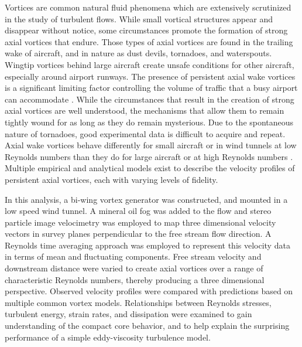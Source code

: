 Vortices are common natural fluid phenomena which are extensively scrutinized 
in the study of turbulent flows. While small vortical structures appear and 
disappear without notice, some circumstances promote the formation of strong 
axial vortices that endure. Those types of axial vortices are found in the 
trailing wake of aircraft, and in nature as dust devils, tornadoes, and 
waterspouts. Wingtip vortices behind large aircraft create unsafe conditions 
for other aircraft, especially around airport runways. The presence of 
persistent axial wake vortices is a significant limiting factor controlling the 
volume of traffic that a busy airport can accommodate \cite{hallock1991}. While 
the circumstances that result 
in the creation of strong axial vortices are well understood, the mechanisms 
that allow them to remain tightly wound for as long as they do remain 
mysterious. 
Due to the spontaneous nature of tornadoes, good experimental data is difficult 
to acquire and repeat. Axial wake vortices behave differently for 
small aircraft or in wind tunnels at low Reynolds numbers than they do for 
large aircraft or at high Reynolds numbers \cite{burnam2013}. Multiple 
empirical and analytical models exist to describe the velocity profiles of 
persistent axial vortices, each with varying levels of fidelity.

In this analysis, a bi-wing vortex generator was constructed, and mounted in 
a low speed wind tunnel. A mineral oil fog was added to the flow and stereo 
particle image velocimetry was employed to map three dimensional velocity 
vectors in survey planes perpendicular to the free stream flow direction. A 
Reynolds time averaging approach was employed to represent this velocity data 
in terms of mean and fluctuating components. Free stream velocity and 
downstream distance were varied to create axial vortices over a range of 
characteristic Reynolds numbers, thereby producing a three dimensional 
perspective. Observed velocity profiles were compared with predictions based on 
multiple common vortex models. Relationships between 
Reynolds stresses, turbulent energy, strain rates, and dissipation were
examined to gain understanding of the compact core behavior, and to help 
explain the surprising performance of a simple eddy-viscosity turbulence model.